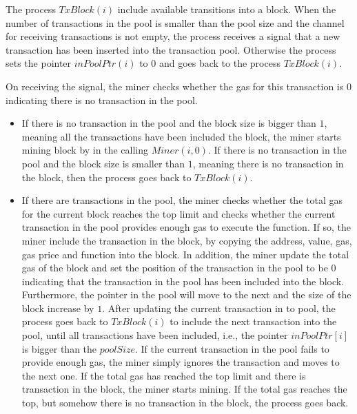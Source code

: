 \documentclass{KERauth}
\begin{document}
The process $TxBlock(i)$ include available transitions into a block. When the number of transactions in the pool is smaller than the pool size and the channel for receiving transactions is not empty, the process receives a signal that a new transaction has been inserted into the transaction pool. Otherwise the process sets the pointer $inPoolPtr(i)$ to $0$ and goes back to the process $TxBlock(i)$.

On receiving the signal, the miner checks whether the gas for this transaction is $0$ indicating there is no transaction in the pool.
%
\begin{itemize}
\item If there is no transaction in the pool and the block size is bigger than $1$, meaning all the transactions have been included  the block, the miner starts mining  block by in the calling $Miner(i, 0)$. If there is no transaction in the pool and the block size is smaller than $1$, meaning there is no transaction in the block, then the process goes back to $TxBlock(i)$.

\item If there are transactions in the pool, the miner checks whether the total gas for the current block reaches the top limit and checks whether the current transaction in the pool provides enough gas to execute the function. If so, the miner include the transaction in the block, by copying the address, value, gas, gas price and function into the block. In addition, the miner update the total gas of the block and set the position of the transaction in the pool to be $0$ indicating that the transaction in the pool has been included into the block. Furthermore, the pointer in the pool will move to the next and the size of the block increase by $1$. After updating the current transaction in to pool, the process goes back to $TxBlock(i)$ to include the next transaction into the pool, until all transactions have been included, i.e., the pointer $inPoolPtr[i]$ is bigger than the $poolSize$. If the current transaction in the pool fails to provide enough gas, the miner simply ignores the transaction and moves to the next one. If the total gas has reached the top limit and there is transaction in the block, the miner starts mining. If the total gas reaches the top, but somehow there is no transaction in the block, the process goes back.
\end{itemize}
\end{document}
